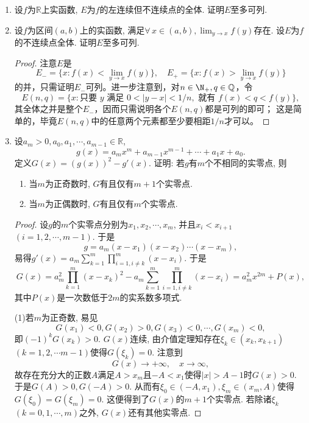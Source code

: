 \begin{3b}
\begin{enumerate}
\begin{proof}
(2)当\(n\)为奇数时, \(n-1\)为偶数, 由(1)知\(f_n'(x)=f_{n-1}(x)>0\). 
\(f_n(x)\)在\(\R\)上严格单调递增, 由于\(\lim_{x\rightarrow-\infty}f_n(x)=-\infty,f_n(0)=1>0\), 知\(f_n(x)\)由唯一的实零点.
\end{proof}
\item 设\(f\)为\(\mathbb{R}\)上实函数, \(E\)为\(f\)的左连续但不连续点的全体. 证明\(E\)至多可列.
\item 设\(f\)为区间\((a,b)\)上的实函数, 满足\(\forall\,x\in(a,b),\lim_{y\rightarrow x}f(y)\)存在. 
设\(E\)为\(f\)的不连续点全体. 证明\(E\)至多可列.
\begin{proof}
    注意\(E\)是\[E_-=\big\{x:f(x)<\lim_{y\rightarrow x}f(y)\big\},
    \quad E_+=\big\{x:f(x)>\lim_{y\rightarrow x}f(y)\big\}\]
    的并，只需证明\(E_-\)可列。进一步注意到，对\(n\in\N_+,q\in\mathbb{Q}\)，令
    \[E(n,q)=\big\{x:\text{只要 }y\text{ 满足 }0<|y-x|<1/n,\text{ 就有 }f(x)<q<f(y)\big\},\]
    其全体之并是整个$E_-$，因而只需说明各个$E(n,q)$都是可列的即可；
    这是简单的，毕竟$E(n,q)$中的任意两个元素都至少要相距$1/n$才可以。
\end{proof}
\item 设\(a_m>0,a_0,a_1,\cdots,a_{m-1}\in\mathbb{R}\),
\[g(x)=a_mx^m+a_{m-1}x^{m-1}+\cdots+a_1x+a_0.\]
定义\(G(x)=(g(x))^2-g'(x)\). 证明: 若\(g\)有\(m\)个不相同的实零点, 则
\begin{enumerate}[label=(\arabic*)]
\item 当\(m\)为正奇数时, \(G\)有且仅有\(m+1\)个实零点.
\item 当\(m\)为正偶数时, \(G\)有且仅有\(m\)个实零点.
\end{enumerate}
\begin{proof}
设\(g\)的\(m\)个实零点分别为\(x_1,x_2,\cdots,x_m\),  
并且\(x_i<x_{i+1}\) \((i=1,2,\cdots,m-1)\). 于是
\[g=a_m(x-x_1)(x-x_2)\cdots(x-x_m),\]
易得\(g'(x)=a_m\sum_{k=1}^{m}\prod_{i=1,i\ne k}^{m}(x-x_i)\). 于是
\[G(x)=a_m^2\prod_{k=1}^{m}(x-x_k)^2-a_m\sum_{k=1}^{m}\prod_{i=1,i\ne k}^{m}(x-x_i)=a_m^2x^{2m}+P(x),\]
其中\(P(x)\)是一次数低于\(2m\)的实系数多项式.

(1)若\(m\)为正奇数, 易见\[G(x_1)<0,G(x_2)>0,G(x_3)<0,\cdots,G(x_m)<0,\]
即\((-1)^kG(x_k)>0\). \(G(x)\)连续, 由介值定理知存在\(\xi_k\in(x_k,x_{k+1})\) \((k=1,2,\cdots m-1)\)使得\(G(\xi_k)=0\). 注意到
\[G(x)\rightarrow+\infty,\quad x\rightarrow\infty,\]
故存在充分大的正数\(A\)满足\(A>x_m\)且\(-A<x_1\)使得\(|x|>A-1\)时\(G(x)> 0\). 
于是\(G(A)>0,G(-A)>0\). 从而有\(\xi_0\in(-A,x_1),\xi_m\in(x_m,A)\)使得\(G(\xi_0)=G(\xi_m)=0\). 这便得到了\(G(x)\)的\(m+1\)个实零点. 
若除诸\(\xi_k\) \((k=0,1,\cdots,m)\)之外, \(G(x)\)还有其他实零点.


\end{proof}
\end{enumerate}
\end{3b}
